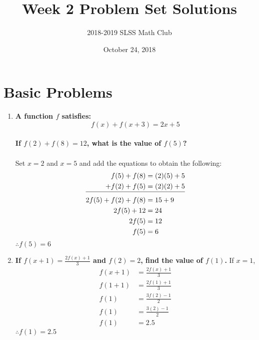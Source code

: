 \documentclass[12pt]{article}
\title{Week 2 Problem Set Solutions\vspace{-3mm}}
\author{2018-2019 SLSS Math Club\vspace{-5mm}}
\date{October 24, 2018 \vspace{-5mm}}
\begin{document}
\maketitle

\section*{Basic Problems}
\begin{enumerate}
    \item \textbf{A function $f$ satisfies: \\ $$f(x) + f(x + 3) = 2x + 5$$ \\ If $f(2) + f(8) = 12$, what is the value of $f(5)$?} \\ \\
    Set $x = 2$ and $x = 5$ and add the equations to obtain the following:
    \begin{align*}
        f(5)+f(8)&=(2)(5)+5 \\
        + f(2)+f(5)&=(2)(2)+5 \\[-10pt]
        \cline{1-2}
        2f(5)+f(2)+f(8)&=15+9 \\
        2f(5)+12&=24 \\
        2f(5)&=12 \\
        f(5)&=6
    \end{align*}
    $\therefore f(5) = 6$

    \item \textbf{If $f(x+1)=\frac{2f(x)+1}{3}$ and $f(2) = 2$, find the value of $f(1)$.}
    If $x = 1$,
    \begin{align*}
        f(x+1)&=\frac{2f(x)+1}{3} \\
        f(1 + 1)&=\frac{2f(1)+1}{3} \\
        f(1)&=\frac{3f(2)-1}{2} \\
        f(1)&=\frac{3(2)-1}{2} \\
        f(1)&=2.5
    \end{align*}
    $\therefore f(1) = 2.5$
    
\end{enumerate} \newpage
\end{document}
